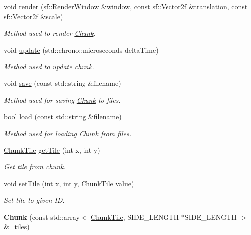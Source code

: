 \begin{DoxyCompactItemize}
\item 
void \hyperlink{classChunk_a0353e35c14d4f576542660bb762db51f}{render} (sf\-::\-Render\-Window \&window, const sf\-::\-Vector2f \&translation, const sf\-::\-Vector2f \&scale)
\begin{DoxyCompactList}\small\item\em Method used to render \hyperlink{classChunk}{Chunk}. \end{DoxyCompactList}\item 
void \hyperlink{classChunk_aa794fcda8fe859680cbfe4a2bcd5d097}{update} (std\-::chrono\-::microseconds delta\-Time)
\begin{DoxyCompactList}\small\item\em Method used to update chunk. \end{DoxyCompactList}\item 
void \hyperlink{classChunk_ac3e70286e057eb0f93accec639047097}{save} (const std\-::string \&filename)
\begin{DoxyCompactList}\small\item\em Method used for saving \hyperlink{classChunk}{Chunk} to files. \end{DoxyCompactList}\item 
bool \hyperlink{classChunk_afa9fe7d9713cbf4fbe75520dd760880a}{load} (const std\-::string \&filename)
\begin{DoxyCompactList}\small\item\em Method used for loading \hyperlink{classChunk}{Chunk} from files. \end{DoxyCompactList}\item 
\hyperlink{classChunkTile}{Chunk\-Tile} \hyperlink{classChunk_a1246a3c50c305dca427ca51f438d1336}{get\-Tile} (int x, int y)
\begin{DoxyCompactList}\small\item\em Get tile from chunk. \end{DoxyCompactList}\item 
void \hyperlink{classChunk_ab5533469c17720e23b3b83d219536fc5}{set\-Tile} (int x, int y, \hyperlink{classChunkTile}{Chunk\-Tile} value)
\begin{DoxyCompactList}\small\item\em Set tile to given I\-D. \end{DoxyCompactList}\item 
\hypertarget{classChunk_a39d2b4d73d01932ad31dbb0b4c2597ea}{{\bfseries Chunk} (const std\-::array$<$ \hyperlink{classChunkTile}{Chunk\-Tile}, S\-I\-D\-E\-\_\-\-L\-E\-N\-G\-T\-H $\ast$S\-I\-D\-E\-\_\-\-L\-E\-N\-G\-T\-H $>$ \&\-\_\-tiles)}\label{classChunk_a39d2b4d73d01932ad31dbb0b4c2597ea}

\end{DoxyCompactItemize}
